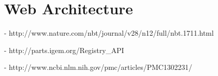 \section{Web Architecture}

\begin{center}
\resizebox{!}{0.95\textheight}{}
\end{center}

\begin{thebibliography}{99\kern\bibindent}
\makeatletter
\let\old@biblabel\@biblabel
\def\@biblabel#1{\old@biblabel{#1}\kern\bibindent}
\let\old@bibitem\bibitem
\def\bibitem#1{\old@bibitem{#1}\leavevmode\kern-\bibindent}
\makeatother

        http://www.nature.com/nbt/journal/v28/n12/full/nbt.1711.html
        
	http://parts.igem.org/Registry\_API

	http://www.ncbi.nlm.nih.gov/pmc/articles/PMC1302231/ 
\end{thebibliography}



